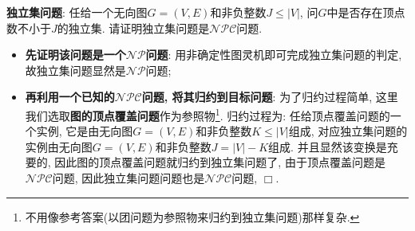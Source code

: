 \documentclass{article}
\begin{document}
\begin{homeworkProblem}
	\textbf{独立集问题}: 任给一个无向图$G=(V,E)$和非负整数$J\leq |V|$, 问$G$中是否存在顶点数不小于$J$的独立集. 请证明独立集问题是$\mathcal{NPC}$问题.

	\solution 
	\begin{itemize}
		\item \textbf{先证明该问题是一个$\mathcal{NP}$问题}: 用非确定性图灵机即可完成独立集问题的判定, 故独立集问题显然是$\mathcal{NP}$问题;
		\item \textbf{再利用一个已知的$\mathcal{NPC}$问题, 将其归约到目标问题}: 为了归约过程简单, 这里我们选取\textbf{图的顶点覆盖问题}作为参照物\footnote{不用像参考答案(以团问题为参照物来归约到独立集问题)那样复杂.}. 归约过程为: 任给顶点覆盖问题的一个实例, 它是由无向图$G=(V,E)$和非负整数$K\leq |V|$组成, 对应独立集问题的实例由无向图$G=(V,E)$和非负整数$J=|V|-K$组成. 并且显然该变换是充要的, 因此图的顶点覆盖问题就归约到独立集问题了, 由于顶点覆盖问题是$\mathcal{NPC}$问题, 因此独立集问题问题也是$\mathcal{NPC}$问题, $\Box$.
	\end{itemize}
\end{homeworkProblem}
\end{document}
